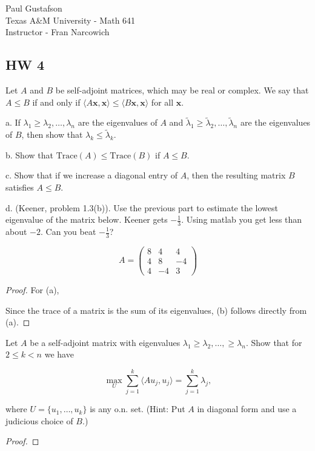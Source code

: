 \documentclass{article}
\begin{document}
\noindent Paul Gustafson\\
\noindent Texas A\&M University - Math 641\\ 
\noindent Instructor - Fran Narcowich

\subsection*{HW 4}
  Let $A$ and $B$ be self-adjoint matrices, which may be real or
  complex. We say that $A\le B$ if and only if $\langle A\mathbf
  x,\mathbf x\rangle \le \langle B\mathbf x,\mathbf x\rangle$ for all
  $\mathbf x$. 

a. If $\lambda_1\ge \lambda_2,\ldots,\lambda_n$ are the eigenvalues
  of $A$ and $\tilde \lambda_1\ge \tilde \lambda_2,\ldots,\tilde
  \lambda_n$ are the eigenvalues of $B$, then show that $\lambda_k \le
  \tilde \lambda_k$.

b. Show that $\text{Trace}(A) \le \text{Trace}(B)$ if $A\le B$.

c. Show that if we increase a diagonal entry of $A$, then the
  resulting matrix $B$ satisfies $A\le B$.

d. (Keener, problem 1.3(b)). Use the previous part to estimate the
lowest eigenvalue of the matrix below. Keener gets $-\frac13$. Using
matlab you get less than about $-2$. Can you beat $-\frac13$?

\[ 
A=\begin{pmatrix}8 & 4 & 4\\ 4 & 8 & -4 \\ 4 &
-4 & 3\end{pmatrix} 
\]

\begin{proof}
For (a), 

Since the trace of a matrix is the sum of its eigenvalues, (b) follows directly from (a).

\end{proof}



 Let $A$ be a self-adjoint matrix with eigenvalues $\lambda_1\ge
\lambda_2,\ldots,\ge \lambda_n$. Show that for $ 2\le k < n$ we have 

\[ \max_U \sum_{j=1}^k \langle Au_j,u_j \rangle =\sum_{j=1}^k
\lambda_j, \]

where $U=\{u_1,\ldots,u_k\}$ is any o.n. set.  (Hint: Put $A$ in
diagonal form and use a judicious choice of $B$.)

\begin{proof}
\end{proof}
\end{document}
